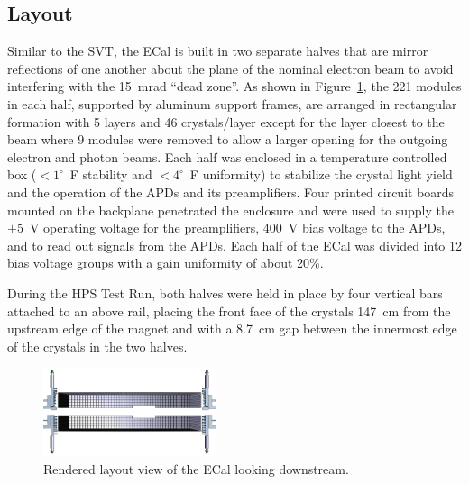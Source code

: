 \documentclass[final,3p,times,twocolumn]{elsarticle}
\begin{document}
\subsection{Layout}
Similar to the SVT, the ECal is built in two separate halves that are mirror reflections of one another 
about the plane of the nominal electron beam to avoid interfering with the 15~mrad ``dead zone''. 
As shown in Figure~\ref{fig:ecal}, the 221 modules in each half, supported by aluminum support frames, 
are arranged in rectangular formation with 5 layers and 46 crystals/layer except for the layer closest to 
the beam where 9 modules were removed to allow a larger opening for the outgoing electron and 
photon beams. Each half was enclosed in a temperature controlled box ($<1^{\circ}$~F stability and 
$<4^{\circ}$~F uniformity) to stabilize the crystal light yield and the operation of the APDs and its 
preamplifiers. 
Four printed circuit boards mounted on the backplane penetrated the enclosure and were used to 
supply the $\pm 5$~V operating voltage for the preamplifiers, 400~V bias voltage to the APDs, and to 
read out signals from the APDs. Each half of the ECal was divided into 12 bias voltage groups with a 
gain uniformity of about 20\%. 

During the HPS Test Run, both halves were held in place by four vertical bars attached to an above rail, 
placing the front face of the crystals 147~cm from the upstream edge of the magnet and with a 
8.7~cm gap between the innermost edge of the crystals in the two halves.
{\small
\begin{figure}[]
\begin{center}
\includegraphics[width=0.45\textwidth]{figures/ECal}
\caption{Rendered layout view of the ECal looking downstream.}
\label{fig:ecal}
\end{center}
\end{figure}
}
\end{document}
